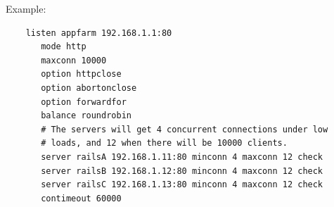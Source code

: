 Example:

\begin{verbatim}
    listen appfarm 192.168.1.1:80
       mode http
       maxconn 10000
       option httpclose
       option abortonclose
       option forwardfor
       balance roundrobin
       # The servers will get 4 concurrent connections under low
       # loads, and 12 when there will be 10000 clients.
       server railsA 192.168.1.11:80 minconn 4 maxconn 12 check
       server railsB 192.168.1.12:80 minconn 4 maxconn 12 check
       server railsC 192.168.1.13:80 minconn 4 maxconn 12 check
       contimeout 60000
\end{verbatim}
